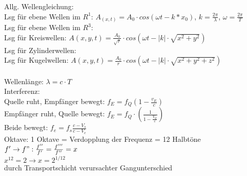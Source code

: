 \documentclass[A4]{scrreprt}
\begin{document}
  
  Allg. Wellengleichung:\\
  Lsg für ebene Wellen im $R^1$: $A_{(x,t)} = A_0\cdot cos(\omega t - k*x_0)$, $k = \frac{2\pi}{\lambda}$, $\omega = \frac{2\pi}{T}$\\
  Lsg für ebene Wellen im $R^3$: \\
  Lsg für Kreiswellen: $A(x,y,t) = \frac{A_0}{\sqrt{r}}\cdot cos(\omega t - |k|\cdot\sqrt{x^2+y^2})$\\
  Lsg für Zylinderwellen: \\
  Lsg für Kugelwellen: $A(x,y,t) = \frac{A_0}{r}\cdot cos(\omega t - |k|\cdot \sqrt{x^2+y^2+z^2})$\\
  \\
  Wellenlänge: $\lambda = c\cdot T$\\  

  Interferenz:\\

  Quelle ruht, Empfänger bewegt: $f_E = f_Q (1-\frac{v_E}{c})$\\
  Empfänger ruht, Quelle bewegt: $f_E = f_Q\cdot(\frac{1}{1-\frac{V_Q}{c}})$\\
  Beide bewegt: $f_e=f_s\frac{c-{V_s}}{c-{V_e}}$\\
  Oktave: 1 Oktave = Verdopplung der Frequenz = 12 Halbtöne\\
  $f' \rightarrow f": \frac{f''}{f'} = \frac{f'''}{f''} = x$\\
  $x^{12} = 2 \rightarrow x = 2^{1/12}$\\


  durch Transportschicht verursachter Gangunterschied
  
\end{document}
